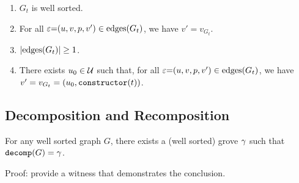 \begin{definition}
\begin{itemize}
\begin{enumerate}
        \item $G_t$ is well sorted.
        \item For all $\varepsilon{=}(u, v, p, v') \in \text{edges}\mathopen{}\left(G_t\right)\mathclose{}$,
          we have $v' = v_{G_t}$.
        \item $\left\lvert\text{edges}\mathopen{}\left(G_t\right)\mathclose{}\right\rvert \geq 1$.
        \item There exists $u_0 \in \mathcal{U}$ such that,
          for all $\varepsilon{=}(u, v, p, v') \in \text{edges}\mathopen{}\left(G_t\right)\mathclose{}$,
          we have $v' = v_{G_t} = (u_0, \operatorname{\texttt{constructor}}\mathopen{}\left(t\right)\mathclose{})$.
      \end{enumerate}
  \end{itemize}
\end{definition}



\subsection{Decomposition and Recomposition}

\begin{theorem}
  For any well sorted graph $G$,
  there exists a (well sorted) grove $\gamma$
  such that $\operatorname{\texttt{decomp}}\mathopen{}\left(G\right)\mathclose{} = \gamma$.
\end{theorem}

Proof: provide a witness that demonstrates the conclusion.



\figureDecompositionDefHelpersContent


